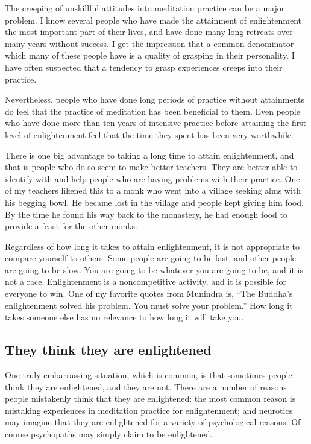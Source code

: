 \documentclass[a5paper,10pt,english]{book}
\begin{document}
\sphinxAtStartPar
The creeping of unskillful attitudes into meditation practice can be a
major problem. I know several people who have made the attainment of
enlightenment the most important part of their lives, and have done many
long retreats over many years without success. I get the impression that
a common denominator which many of these people have is a quality of
grasping in their personality. I have often suspected that a tendency to
grasp experiences creeps into their practice.

\sphinxAtStartPar
Nevertheless, people who have done long periods of practice without
attainments do feel that the practice of meditation has been beneficial
to them. Even people who have done more than ten years of intensive
practice before attaining the first level of enlightenment feel that the
time they spent has been very worthwhile.

\sphinxAtStartPar
There is one big advantage to taking a long time to attain
enlightenment, and that is people who do so seem to make better
teachers. They are better able to identify with and help people who are
having problems with their practice. One of my teachers likened this to
a monk who went into a village seeking alms with his begging bowl. He
became lost in the village and people kept giving him food. By the time
he found his way back to the monastery, he had enough food to provide a
feast for the other monks.

\sphinxAtStartPar
Regardless of how long it takes to attain enlightenment, it is not
appropriate to compare yourself to others. Some people are going to be
fast, and other people are going to be slow. You are going to be
whatever you are going to be, and it is not a race. Enlightenment is a
noncompetitive activity, and it is possible for everyone to win. One of
my favorite quotes from Munindra is, “The Buddha’s enlightenment solved
his problem. You must solve your problem.” How long it takes someone
else has no relevance to how long it will take you.


\subsection{They think they are enlightened}
\label{\detokenize{saints:they-think-they-are-enlightened}}
\sphinxAtStartPar
One truly embarrassing situation, which is common, is that
sometimes people think they are enlightened, and they are not. There are
a number of reasons people mistakenly think that they are enlightened:
the most common reason is mistaking experiences in meditation practice
for enlightenment; and neurotics may imagine that they are enlightened
for a variety of psychological reasons. Of course psychopaths may simply
claim to be enlightened.
\end{document}
